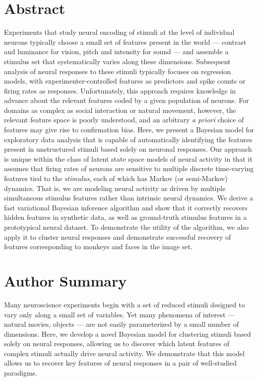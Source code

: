 \documentclass[10pt,letterpaper]{article}
\begin{document}
\section*{Abstract}
Experiments that study neural encoding of stimuli at the level of individual neurons typically choose a small set of features present in the world --- contrast and luminance for vision, pitch and intensity for sound --- and assemble a stimulus set that systematically varies along these dimensions. Subsequent analysis of neural responses to these stimuli typically focuses on regression models, with experimenter-controlled features as predictors and spike counts or firing rates as responses. Unfortunately, this approach requires knowledge in advance about the relevant features coded by a given population of neurons. For domains as complex as social interaction or natural movement, however, the relevant feature space is poorly understood, and an arbitrary \emph{a priori} choice of features may give rise to confirmation bias. Here, we present a Bayesian model for exploratory data analysis that is capable of automatically identifying the features present in unstructured stimuli based solely on neuronal responses. Our approach is unique within the class of latent state space models of neural activity in that it assumes that firing rates of neurons are sensitive to multiple discrete time-varying features tied to the \emph{stimulus}, each of which has Markov (or semi-Markov) dynamics. That is, we are modeling neural activity as driven by multiple simultaneous stimulus features rather than intrinsic neural dynamics.  We derive a fast variational Bayesian inference algorithm and show that it correctly recovers hidden features in synthetic data, as well as ground-truth stimulus features in a prototypical neural dataset. To demonstrate the utility of the algorithm, we also apply it to cluster neural responses and demonstrate successful recovery of features corresponding to monkeys and faces in the image set.

\section*{Author Summary}
Many neuroscience experiments begin with a set of reduced stimuli designed to vary only along a small set of variables. Yet many phenomena of interest --- natural movies, objects --- are not easily parameterized by a small number of dimensions. Here, we develop a novel Bayesian model for clustering stimuli based solely on neural responses, allowing us to discover which latent features of complex stimuli actually drive neural activity. We demonstrate that this model allows us to recover key features of neural responses in a pair of well-studied paradigms.
\end{document}
